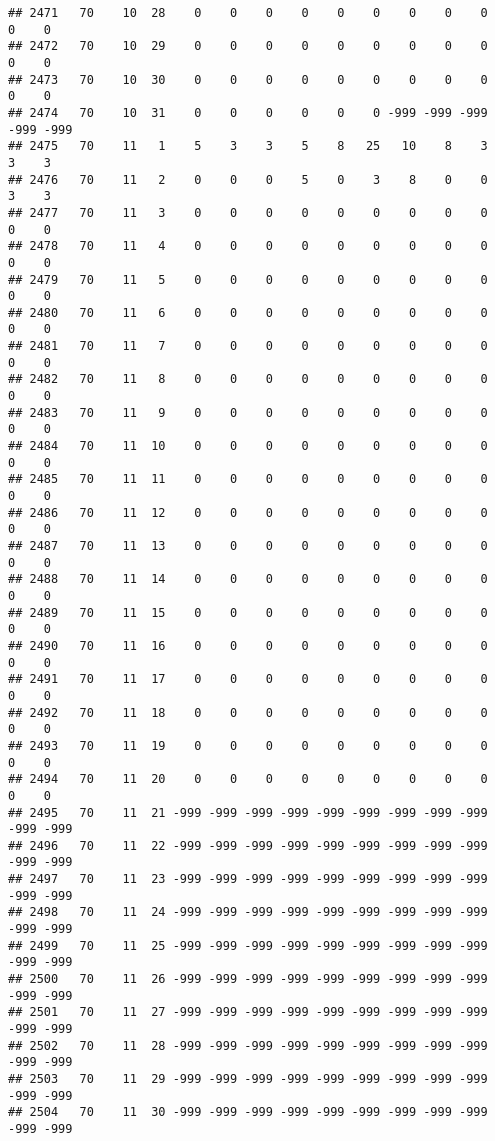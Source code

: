 \documentclass[]{article}
\begin{document}
\begin{verbatim}
## 2471   70    10  28    0    0    0    0    0    0    0    0    0    0    0
## 2472   70    10  29    0    0    0    0    0    0    0    0    0    0    0
## 2473   70    10  30    0    0    0    0    0    0    0    0    0    0    0
## 2474   70    10  31    0    0    0    0    0    0 -999 -999 -999 -999 -999
## 2475   70    11   1    5    3    3    5    8   25   10    8    3    3    3
## 2476   70    11   2    0    0    0    5    0    3    8    0    0    3    3
## 2477   70    11   3    0    0    0    0    0    0    0    0    0    0    0
## 2478   70    11   4    0    0    0    0    0    0    0    0    0    0    0
## 2479   70    11   5    0    0    0    0    0    0    0    0    0    0    0
## 2480   70    11   6    0    0    0    0    0    0    0    0    0    0    0
## 2481   70    11   7    0    0    0    0    0    0    0    0    0    0    0
## 2482   70    11   8    0    0    0    0    0    0    0    0    0    0    0
## 2483   70    11   9    0    0    0    0    0    0    0    0    0    0    0
## 2484   70    11  10    0    0    0    0    0    0    0    0    0    0    0
## 2485   70    11  11    0    0    0    0    0    0    0    0    0    0    0
## 2486   70    11  12    0    0    0    0    0    0    0    0    0    0    0
## 2487   70    11  13    0    0    0    0    0    0    0    0    0    0    0
## 2488   70    11  14    0    0    0    0    0    0    0    0    0    0    0
## 2489   70    11  15    0    0    0    0    0    0    0    0    0    0    0
## 2490   70    11  16    0    0    0    0    0    0    0    0    0    0    0
## 2491   70    11  17    0    0    0    0    0    0    0    0    0    0    0
## 2492   70    11  18    0    0    0    0    0    0    0    0    0    0    0
## 2493   70    11  19    0    0    0    0    0    0    0    0    0    0    0
## 2494   70    11  20    0    0    0    0    0    0    0    0    0    0    0
## 2495   70    11  21 -999 -999 -999 -999 -999 -999 -999 -999 -999 -999 -999
## 2496   70    11  22 -999 -999 -999 -999 -999 -999 -999 -999 -999 -999 -999
## 2497   70    11  23 -999 -999 -999 -999 -999 -999 -999 -999 -999 -999 -999
## 2498   70    11  24 -999 -999 -999 -999 -999 -999 -999 -999 -999 -999 -999
## 2499   70    11  25 -999 -999 -999 -999 -999 -999 -999 -999 -999 -999 -999
## 2500   70    11  26 -999 -999 -999 -999 -999 -999 -999 -999 -999 -999 -999
## 2501   70    11  27 -999 -999 -999 -999 -999 -999 -999 -999 -999 -999 -999
## 2502   70    11  28 -999 -999 -999 -999 -999 -999 -999 -999 -999 -999 -999
## 2503   70    11  29 -999 -999 -999 -999 -999 -999 -999 -999 -999 -999 -999
## 2504   70    11  30 -999 -999 -999 -999 -999 -999 -999 -999 -999 -999 -999

\end{verbatim}
\end{document}
